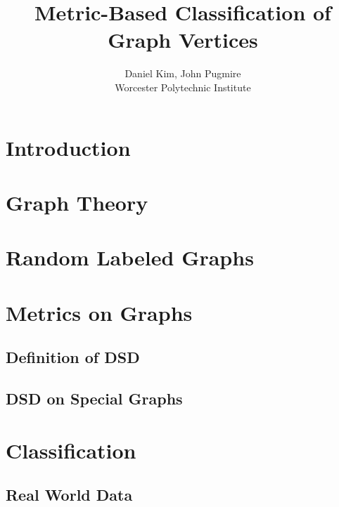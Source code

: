 \documentclass[11pt,oneside]{report}
\theoremstyle{definition}
\begin{document}
\title{Metric-Based Classification of Graph Vertices}
\author{Daniel Kim, John Pugmire\\Worcester Polytechnic Institute\\}
\maketitle
\tableofcontents


\chapter{Introduction}

\chapter{Graph Theory}

% 



\chapter{Random Labeled Graphs}



\chapter{Metrics on Graphs}

\section{Definition of DSD}


\section{DSD on Special Graphs}



\chapter{Classification}

\section{Real World Data}

\end{document}
